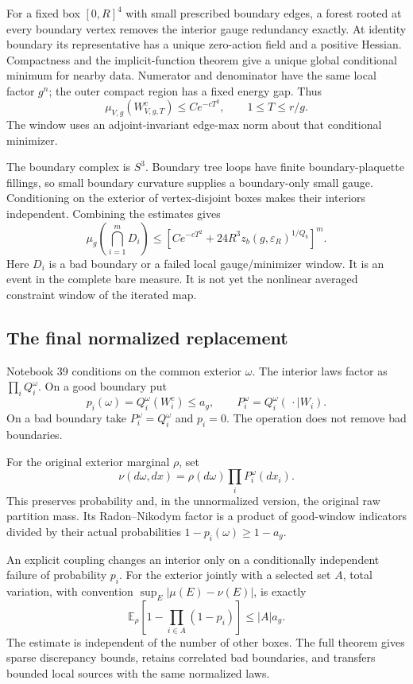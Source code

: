 \documentclass[11pt]{article}
\theoremstyle{remark}
\begin{document}
For a fixed box \([0,R]^4\) with small prescribed
boundary edges, a forest rooted at every boundary
vertex removes the interior gauge redundancy exactly.
At identity boundary its representative has a unique
zero-action field and a positive Hessian. Compactness
and the implicit-function theorem give a unique global
conditional minimum for nearby data. Numerator and
denominator have the same local factor \(g^n\);
the outer compact region has a fixed energy gap. Thus
\[
      \mu_{V,g}(W_{V,g,T}^c)\le Ce^{-cT^2},
      \qquad 1\le T\le r/g.
\]
The window uses an adjoint-invariant edge-max norm
about that conditional minimizer.

The boundary complex is \(S^3\). Boundary tree loops
have finite boundary-plaquette fillings, so small
boundary curvature supplies a boundary-only small
gauge. Conditioning on the exterior of vertex-disjoint
boxes makes their interiors independent. Combining
the estimates gives
\[
 \mu_g\left(\bigcap_{i=1}^m D_i\right)
 \le \left[Ce^{-cT^2}
       +24R^3 z_b(g,\varepsilon_R)^{1/Q_b}\right]^m.
\]
Here \(D_i\) is a bad boundary or a failed local
gauge/minimizer window. It is an event in the complete
bare measure. It is not yet the nonlinear averaged
constraint window of the iterated map.

\subsection{The final normalized replacement}

Notebook 39 conditions on the common exterior \(\omega\).
The interior laws factor as \(\prod_iQ_i^\omega\).
On a good boundary put
\[
 p_i(\omega)=Q_i^\omega(W_i^c)\le a_g,\qquad
 P_i^\omega=Q_i^\omega(\,\cdot\mid W_i).
\]
On a bad boundary take \(P_i^\omega=Q_i^\omega\) and
\(p_i=0\). The operation does not remove bad boundaries.

For the original exterior marginal \(\rho\), set
\[
          \nu(d\omega,dx)=\rho(d\omega)\prod_iP_i^\omega(dx_i).
\]
This preserves probability and, in the unnormalized
version, the original raw partition mass.
Its Radon--Nikodym factor is a product of good-window
indicators divided by their actual probabilities
\(1-p_i(\omega)\ge1-a_g\).

An explicit coupling changes an interior only on a
conditionally independent failure of probability \(p_i\).
For the exterior jointly with a selected set \(A\),
total variation, with convention
\(\sup_E|\mu(E)-\nu(E)|\), is exactly
\[
 \mathbb E_\rho\left[1-\prod_{i\in A}(1-p_i)\right]
 \le |A|a_g.
\]
The estimate is independent of the number of other
boxes. The full theorem gives sparse discrepancy
bounds, retains correlated bad boundaries, and
transfers bounded local sources with the same
normalized laws.
\end{document}
